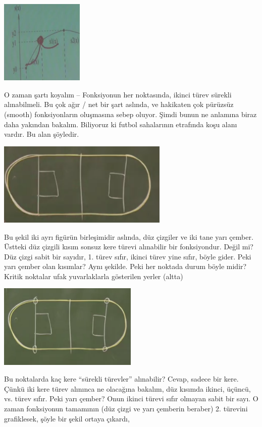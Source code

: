 \documentclass[12pt,fleqn]{article}\usepackage{../../common}
\begin{document}
\includegraphics[height=4cm]{spline4.png}

O zaman şartı koyalım -- Fonksiyonun her noktasında, ikinci türev sürekli
alınabilmeli. Bu çok ağır / net bir şart aslında, ve hakikaten çok pürüzsüz
(smooth) fonksiyonların oluşmasına sebep oluyor. Şimdi bunun ne anlamına
biraz daha yakından bakalım. Biliyoruz ki futbol sahalarının etrafında koşu
alanı vardır. Bu alan şöyledir.

\includegraphics[height=4cm]{spline6.png}

Bu şekil iki ayrı figürün birleşimidir aslında, düz çizgiler ve iki tane
yarı çember. Üstteki düz çizgili kısım sonsuz kere türevi alınabilir bir
fonksiyondur. Değil mi? Düz çizgi sabit bir sayıdır, 1. türev sıfır, ikinci
türev yine sıfır, böyle gider. Peki yarı çember olan kısımlar? Aynı
şekilde. Peki her noktada durum böyle midir? Kritik noktalar ufak
yuvarlaklarla gösterilen yerler (altta)

\includegraphics[height=4cm]{spline7.png}

Bu noktalarda kaç kere ``sürekli türevler'' alınabilir? Cevap, sadece bir
kere. Çünkü iki kere türev alınınca ne olacağına bakalım, düz kısımda
ikinci, üçüncü, vs. türev sıfır. Peki yarı çember? Onun ikinci türevi sıfır
olmayan sabit bir sayı. O zaman fonksiyonun tamamının (düz çizgi ve yarı
çemberin beraber) 2. türevini grafiklesek, şöyle bir şekil ortaya çıkardı,
\end{document}
